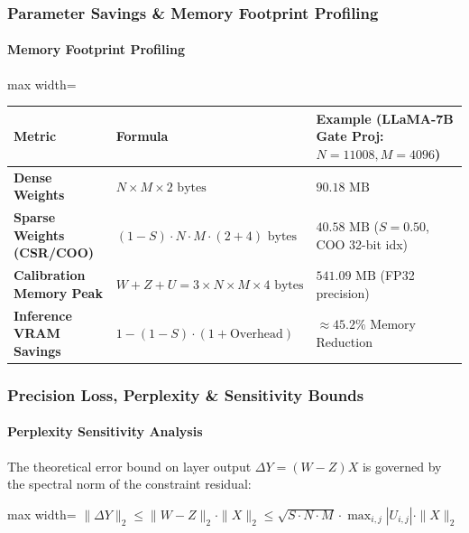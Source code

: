 \subsubsection*{Parameter Savings \& Memory Footprint Profiling}

\paragraph{Memory Footprint Profiling}

\begin{center}
\begin{adjustbox}{max width=\columnwidth}
\renewcommand{\arraystretch}{1.2}
\begin{tabular}{lll}
\toprule
Metric & Formula & Example (LLaMA-7B Gate Proj: $N=11008, M=4096$) \\
\midrule
\textbf{Dense Weights} & $N \times M \times 2 \text{ bytes}$ & $90.18 \text{ MB}$ \\
\textbf{Sparse Weights (CSR/COO)} & $(1 - S) \cdot N \cdot M \cdot (2 + 4) \text{ bytes}$ & $40.58 \text{ MB}$ ($S=0.50$, COO 32-bit idx) \\
\textbf{Calibration Memory Peak} & $W + Z + U = 3 \times N \times M \times 4 \text{ bytes}$ & $541.09 \text{ MB}$ (FP32 precision) \\
\textbf{Inference VRAM Savings} & $1 - (1 - S) \cdot (1 + \text{Overhead})$ & $\approx 45.2\%$ Memory Reduction \\

\bottomrule
\end{tabular}
\end{adjustbox}
\end{center}

\subsubsection*{Precision Loss, Perplexity \& Sensitivity Bounds}

\paragraph{Perplexity Sensitivity Analysis}

The theoretical error bound on layer output $\Delta Y = (W - Z) X$ is governed by the spectral norm of the constraint residual:

\begin{center}
\begin{adjustbox}{max width=\columnwidth}
$\displaystyle
\| \Delta Y \|_2 \le \| W - Z \|_2 \cdot \| X \|_2 \le \sqrt{S \cdot N \cdot M} \cdot \max_{i,j} |U_{i,j}| \cdot \| X \|_2
$
\end{adjustbox}
\end{center}

